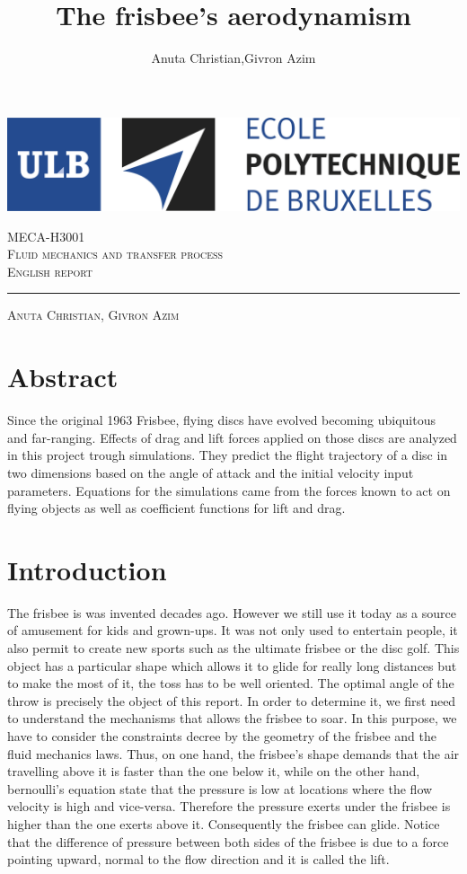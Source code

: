 \documentclass[10pt,a4paper]{report}
\author{Anuta Christian,Givron Azim}
\title{The frisbee's aerodynamism}
\begin{document}
\begin{titlepage}

\includegraphics[scale=0.5]{logo-polytech-ULB-FR.jpg}

\center 
\vspace{5cm}
\textsc{\large MECA-H3001} \\[0.5cm]
\textsc{\LARGE Fluid mechanics and transfer process} \\[1.5cm]
\textsc{\Large English report} %

\rule{\textwidth}{1pt}

\vspace{2cm}

\textsc{\large Anuta Christian, Givron Azim}

\end{titlepage}

\tableofcontents
\newpage 
\listoffigures
\newpage
\section{Abstract}
Since the original 1963 Frisbee, flying discs have evolved becoming ubiquitous and far-ranging. Effects of drag and lift forces applied on those discs are analyzed in this project trough simulations. They predict the flight trajectory of a disc in two dimensions based on the angle of attack and the initial velocity input parameters. Equations for the simulations came from the forces known to act on flying objects as well as coefficient functions for lift and drag.
\section{Introduction}
The frisbee is was invented decades ago. However we still use it today as a source of amusement for kids and grown-ups. It was not only used to entertain people, it also permit to create new sports such as the ultimate frisbee or the disc golf. This object has a particular shape which allows it to glide for really long distances but to make the most of it, the toss has to be well oriented. The optimal angle of the throw is precisely the object of this report. In order to determine it, we first need to understand the mechanisms that allows the frisbee to soar. In this purpose, we have to consider the constraints decree by the geometry of the frisbee and the fluid mechanics laws. Thus, on one hand, the frisbee's shape demands that the air travelling above it is faster than the one below it, while on the other hand, bernoulli's equation state that the pressure is low at locations where the flow velocity is high and vice-versa. Therefore the pressure exerts under the frisbee is higher than the one exerts above it. Consequently the frisbee can glide. Notice that the difference of pressure between both sides of the frisbee is due to a force pointing upward, normal to the flow direction and it is called the lift. 
\end{document}
